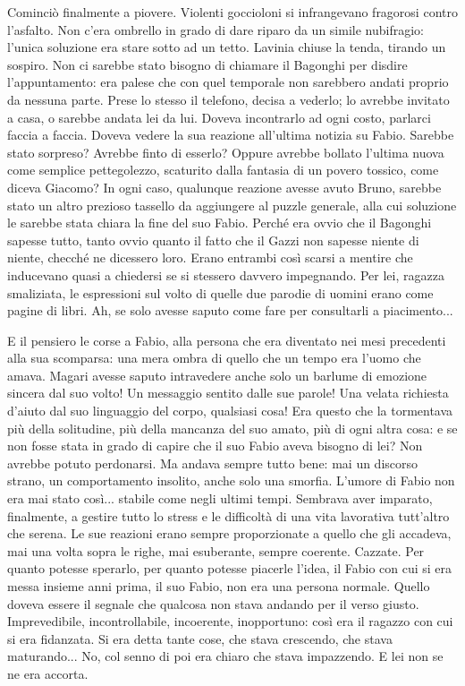 Cominciò finalmente a piovere. Violenti goccioloni si infrangevano fragorosi contro l'asfalto. Non c'era ombrello in grado di dare riparo da un simile nubifragio: l'unica soluzione era stare sotto ad un tetto. Lavinia chiuse la tenda, tirando un sospiro. Non ci sarebbe stato bisogno di chiamare il Bagonghi per disdire l'appuntamento: era palese che con quel temporale non sarebbero andati proprio da nessuna parte. Prese lo stesso il telefono, decisa a vederlo; lo avrebbe invitato a casa, o sarebbe andata lei da lui. Doveva incontrarlo ad ogni costo, parlarci faccia a faccia. Doveva vedere la sua reazione all'ultima notizia su Fabio. Sarebbe stato sorpreso? Avrebbe finto di esserlo? Oppure avrebbe bollato l'ultima nuova come semplice pettegolezzo, scaturito dalla fantasia di un povero tossico, come diceva Giacomo? In ogni caso, qualunque reazione avesse avuto Bruno, sarebbe stato un altro prezioso tassello da aggiungere al puzzle generale, alla cui soluzione le sarebbe stata chiara la fine del suo Fabio. Perché era ovvio che il Bagonghi sapesse tutto, tanto ovvio quanto il fatto che il Gazzi non sapesse niente di niente, checché ne dicessero loro. Erano entrambi così scarsi a mentire che inducevano quasi a chiedersi se si stessero davvero impegnando. Per lei, ragazza smaliziata, le espressioni sul volto di quelle due parodie di uomini erano come pagine di libri. Ah, se solo avesse saputo come fare per consultarli a piacimento...

E il pensiero le corse a Fabio, alla persona che era diventato nei mesi precedenti alla sua scomparsa: una mera ombra di quello che un tempo era l'uomo che amava. Magari avesse saputo intravedere anche solo un barlume di emozione sincera dal suo volto! Un messaggio sentito dalle sue parole! Una velata richiesta d'aiuto dal suo linguaggio del corpo, qualsiasi cosa! Era questo che la tormentava più della solitudine, più della mancanza del suo amato, più di ogni altra cosa: e se non fosse stata in grado di capire che il suo Fabio aveva bisogno di lei? Non avrebbe potuto perdonarsi. Ma andava sempre tutto bene: mai un discorso strano, un comportamento insolito, anche solo una smorfia. L'umore di Fabio non era mai stato così... stabile come negli ultimi tempi. Sembrava aver imparato, finalmente, a gestire tutto lo stress e le difficoltà di una vita lavorativa tutt'altro che serena. Le sue reazioni erano sempre proporzionate a quello che gli accadeva, mai una volta sopra le righe, mai esuberante, sempre coerente. Cazzate. Per quanto potesse sperarlo, per quanto potesse piacerle l'idea, il Fabio con cui si era messa insieme anni prima, il suo Fabio, non era una persona normale. Quello doveva essere il segnale che qualcosa non stava andando per il verso giusto. Imprevedibile, incontrollabile, incoerente, inopportuno: così era il ragazzo con cui si era fidanzata. Si era detta tante cose, che stava crescendo, che stava maturando... No, col senno di poi era chiaro che stava impazzendo. E lei non se ne era accorta.

